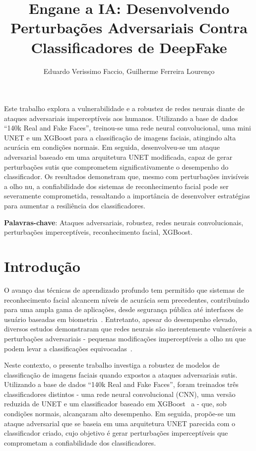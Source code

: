 \documentclass[12pt]{article}
\title{Engane a IA: Desenvolvendo Perturbações Adversariais Contra Classificadores de DeepFake}
\author{Eduardo Verissimo Faccio, Guilherme Ferreira Lourenço}
\begin{document}
\maketitle

\begin{resumo}
    Este trabalho explora a vulnerabilidade e a robustez de redes neurais diante de ataques adversariais
    imperceptíveis aos humanos. Utilizando a base de dados “140k Real and Fake Faces”, treinou-se uma rede
    neural convolucional, uma mini UNET e um XGBoost para a classificação de imagens faciais, atingindo alta
    acurácia em condições normais. Em seguida, desenvolveu-se um ataque adversarial baseado em uma arquitetura
    UNET modificada, capaz de gerar perturbações sutis que comprometem significativamente o desempenho do classificador.
    Os resultados demonstram que, mesmo com perturbações invisíveis a olho nu, a confiabilidade dos sistemas de reconhecimento
    facial pode ser severamente comprometida, ressaltando a importância de desenvolver estratégias para aumentar
    a resiliência dos classificadores.

    \textbf{Palavras-chave}: Ataques adversariais, robustez, redes neurais convolucionais, perturbações imperceptíveis, reconhecimento facial, XGBoost.
\end{resumo}

\section{Introdução}

O avanço das técnicas de aprendizado profundo tem permitido que sistemas de
reconhecimento facial alcancem níveis de acurácia sem precedentes, contribuindo
para uma ampla gama de aplicações, desde segurança pública até interfaces de
usuário baseadas em biometria~\cite{parkhi2015deep}. Entretanto, apesar do
desempenho elevado, diversos estudos demonstraram que redes neurais são
inerentemente vulneráveis a perturbações adversariais - pequenas modificações
imperceptíveis a olho nu que podem levar a classificações
equivocadas~\cite{szegedy2014intriguingpropertiesneuralnetworks,goodfellow2015explainingharnessingadversarialexamples}.

Neste contexto, o presente trabalho investiga a robustez de modelos de
classificação de imagens faciais quando expostos a ataques adversariais sutis.
Utilizando a base de dados ``140k Real and Fake Faces'', foram treinados três
classificadores distintos - uma rede neural convolucional (CNN), uma versão
reduzida de UNET \cite{ronneberger2015u} e um classificador baseado em
XGBoost~\cite{Chen_2016} a - que, sob condições normais, alcançaram alto
desempenho. Em seguida, propõe-se um ataque adversarial que se baseia em uma
arquitetura UNET parecida com o classificador criado, cujo objetivo é gerar
perturbações imperceptíveis que comprometam a confiabilidade dos
classificadores.
\end{document}
